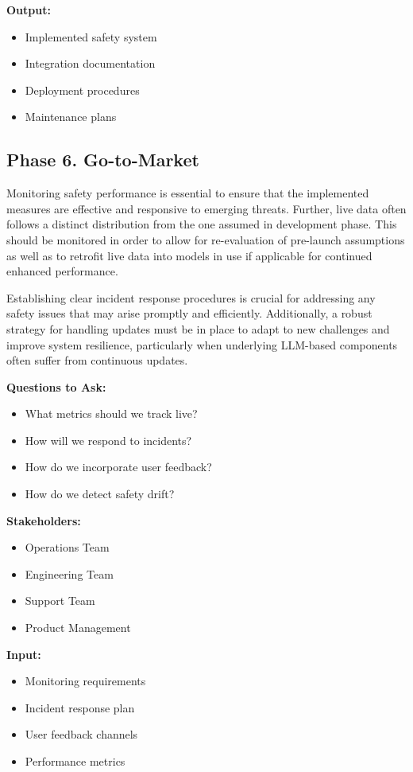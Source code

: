 \textbf{Output:}
\begin{itemize}
    \item Implemented safety system
    \item Integration documentation
    \item Deployment procedures
    \item Maintenance plans
\end{itemize}

\subsection{Phase 6. Go-to-Market}

Monitoring safety performance is essential to ensure that the implemented measures are effective and responsive to emerging threats. Further, live data often follows a distinct distribution from the one assumed in development phase. This should be monitored in order to allow for re-evaluation of pre-launch assumptions as well as to retrofit live data into models in use if applicable for continued enhanced performance.

Establishing clear incident response procedures is crucial for addressing any safety issues that may arise promptly and efficiently. Additionally, a robust strategy for handling updates must be in place to adapt to new challenges and improve system resilience, particularly when underlying LLM-based components often suffer from continuous updates.

\textbf{Questions to Ask:}
\begin{itemize}
    \item What metrics should we track live?
    \item How will we respond to incidents?
    \item How do we incorporate user feedback?
    \item How do we detect safety drift?
\end{itemize}

\textbf{Stakeholders:}
\begin{itemize}
    \item Operations Team
    \item Engineering Team
    \item Support Team
    \item Product Management
\end{itemize}

\textbf{Input:}
\begin{itemize}
    \item Monitoring requirements
    \item Incident response plan
    \item User feedback channels
    \item Performance metrics
\end{itemize}

